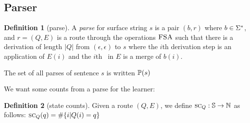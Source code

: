 \documentclass[12pt]{article}
\theoremstyle{definition}
\newtheorem{definition}{Definition}[section]
\begin{document}






\subsection{Parser}
\label{sec:parser}



\begin{definition}[parse]

A \textit{parse} for surface string $s$ is a pair $(b,r)$ where $b\in\Sigma^*$, and $r=(Q,E)$ is a route through the operations $\textsc{FSA}$ such that there is a derivation of length $|Q|$ from
 $(\epsilon,\epsilon)$ to  $s$ where the $i$th derivation step is an application of $E(i)$ and the $i$th \mg~in $E$ is a merge of $b(i)$.

The set of all parses of sentence $s$ is written $\mathbb{P}(s)$
\end{definition}

\noindent We want some counts from a parse for the learner:

\begin{definition}[state counts]
  Given a route $(Q,E)$, we define $\text{\textsc{sc}}_Q : \mathbb{S} \rightarrow\mathbb{N}$ as follows: $\text{\textsc{sc}}_Q(q) = \#\{ i | Q(i)=q \}$
\end{definition}
\end{document}
